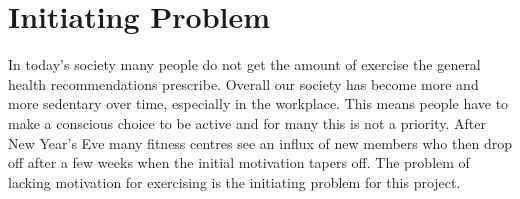 \section{Initiating Problem}
\label{sec:initiating}
In today's society many people do not get the amount of exercise the general health recommendations prescribe. Overall our society has become more and more sedentary over time, especially in the workplace. This means people have to make a conscious choice to be active and for many this is not a priority. After New Year's Eve many fitness centres see an influx of new members who then drop off after a few weeks when the initial motivation tapers off. The problem of lacking motivation for exercising is the initiating problem for this project.